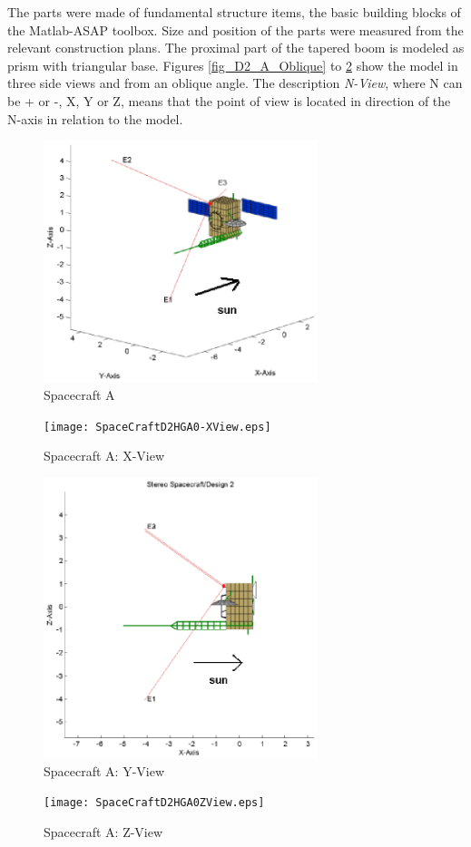 \documentclass[a4paper,14pt]{extbook}
\begin{document}
The parts were made of fundamental structure items, the basic building blocks of the Matlab-ASAP toolbox. Size and position of the parts were measured from the relevant construction plans. The proximal part of
the tapered boom is modeled as prism with triangular base. Figures \ref{fig_D2_A_Oblique} to \ref{fig_D2_A_Z_View} show the model in three side views and from an oblique angle. The description \emph{N-View}, where N can be + or -, X, Y or Z, means that the point of view is located in direction of the N-axis in relation to the model.\\


\begin{figure}
  \begin{center}
\includegraphics[width=8cm]{SpaceCraftD2HGA0Oblique.eps}\\
  \caption{Spacecraft A}\label{fig_D2_A_Oblique}
  \texttt{[image: SpaceCraftD2HGA0-XView.eps]}\\
  \caption{Spacecraft A: X-View}\label{fig_D2_A_X_View}\end{center}
\end{figure}

\begin{figure}
  \begin{center}
\includegraphics[width=8cm]{SpaceCraftD2HGA0-YView.eps}\\
  \caption{Spacecraft A: Y-View}\label{fig_D2_A_Y_View}
  \texttt{[image: SpaceCraftD2HGA0ZView.eps]}\\
  \caption{Spacecraft A: Z-View}\label{fig_D2_A_Z_View}\end{center}
\end{figure}
\end{document}
